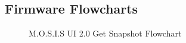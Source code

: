 \newpage
\subsection{Firmware Flowcharts}
\begin{figure}[H]
	\begin{center}
	\end{center}
	\caption{M.O.S.I.S UI 2.0 Get Snapshot Flowchart}
\end{figure}